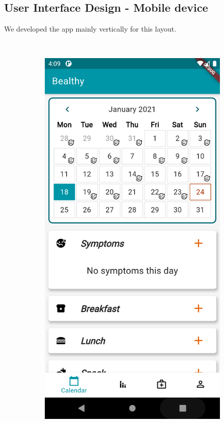 \documentclass [12pt]{article}
\begin{document}
\subsection{User Interface Design - Mobile device}
We developed the app mainly vertically for this layout.
\
\begin{description}[leftmargin=1cm,rightmargin=1cm]
\item [  1)Home page]
\
\
\
\begin{figure}[h!]
\centering
\hspace*{\fill}
\begin{subfigure}[tl]{0.3\linewidth}
\includegraphics[width=\linewidth]{HomePage1.PNG}

\end{subfigure}
\end{figure}
\end{description}
\end{document}
